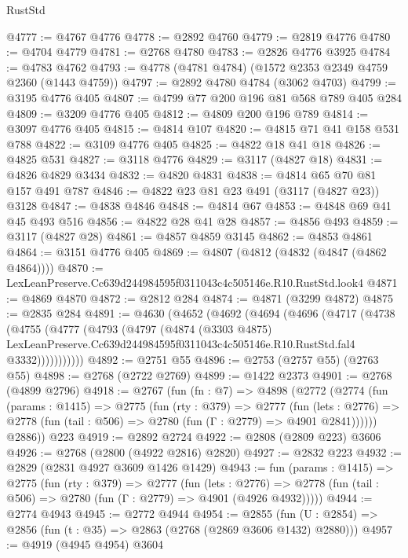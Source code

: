 \begin{lexlean}{RustStd}
\begin{coremodule}
@4777 := @4767 @4776
@4778 := @2892 @4760
@4779 := @2819 @4776
@4780 := @4704 @4779
@4781 := @2768 @4780
@4783 := @2826 @4776 @3925
@4784 := @4783 @4762
@4793 := @4778 (@4781 @4784) (@1572 @2353 @2349 @4759 @2360 (@1443 @4759))
@4797 := @2892 @4780 @4784 (@3062 @4703)
@4799 := @3195 @4776 @405
@4807 := @4799 @77 @200 @196 @81 @568 @789 @405 @284
@4809 := @3209 @4776 @405
@4812 := @4809 @200 @196 @789
@4814 := @3097 @4776 @405
@4815 := @4814 @107
@4820 := @4815 @71 @41 @158 @531 @788
@4822 := @3109 @4776 @405
@4825 := @4822 @18 @41 @18
@4826 := @4825 @531
@4827 := @3118 @4776
@4829 := @3117 (@4827 @18)
@4831 := @4826 @4829 @3434
@4832 := @4820 @4831
@4838 := @4814 @65 @70 @81 @157 @491 @787
@4846 := @4822 @23 @81 @23 @491 (@3117 (@4827 @23)) @3128
@4847 := @4838 @4846
@4848 := @4814 @67
@4853 := @4848 @69 @41 @45 @493 @516
@4856 := @4822 @28 @41 @28
@4857 := @4856 @493
@4859 := @3117 (@4827 @28)
@4861 := @4857 @4859 @3145
@4862 := @4853 @4861
@4864 := @3151 @4776 @405
@4869 := @4807 (@4812 (@4832 (@4847 (@4862 @4864))))
@4870 := LexLeanPreserve.Cc639d244984595f0311043c4c505146e.R10.RustStd.look4
@4871 := @4869 @4870
@4872 := @2812 @284
@4874 := @4871 (@3299 @4872)
@4875 := @2835 @284
@4891 := @4630
    (@4652
      (@4692
        (@4694
          (@4696
            (@4717
              (@4738
                (@4755
                  (@4777
                    (@4793
                      (@4797
                        (@4874
                          (@3303 @4875)
                          LexLeanPreserve.Cc639d244984595f0311043c4c505146e.R10.RustStd.fal4
                          @3332)))))))))))
@4892 := @2751 @55
@4896 := @2753 (@2757 @55) (@2763 @55)
@4898 := @2768 (@2722 @2769)
@4899 := @1422 @2373
@4901 := @2768 (@4899 @2796)
@4918 := @2767
    (fun (fn : @7) =>
    @4898
      (@2772
        (@2774
          (fun (params : @1415) =>
          @2775
            (fun (rty : @379) =>
            @2777
              (fun (lets : @2776) =>
              @2778 (fun (tail : @506) => @2780 (fun (Γ : @2779) => @4901 @2841))))))
        @2886))
    @223
@4919 := @2892 @2724
@4922 := @2808 (@2809 @223) @3606
@4926 := @2768 (@2800 (@4922 @2816) @2820)
@4927 := @2832 @223
@4932 := @2829 (@2831 @4927 @3609 @1426 @1429)
@4943 := fun (params : @1415) =>
  @2775
    (fun (rty : @379) =>
    @2777
      (fun (lets : @2776) =>
      @2778 (fun (tail : @506) => @2780 (fun (Γ : @2779) => @4901 (@4926 @4932)))))
@4944 := @2774 @4943
@4945 := @2772 @4944
@4954 := @2855 (fun (U : @2854) => @2856 (fun (t : @35) => @2863 (@2768 (@2869 @3606 @1432) @2880)))
@4957 := @4919 (@4945 @4954) @3604

\end{coremodule}
\end{lexlean}
